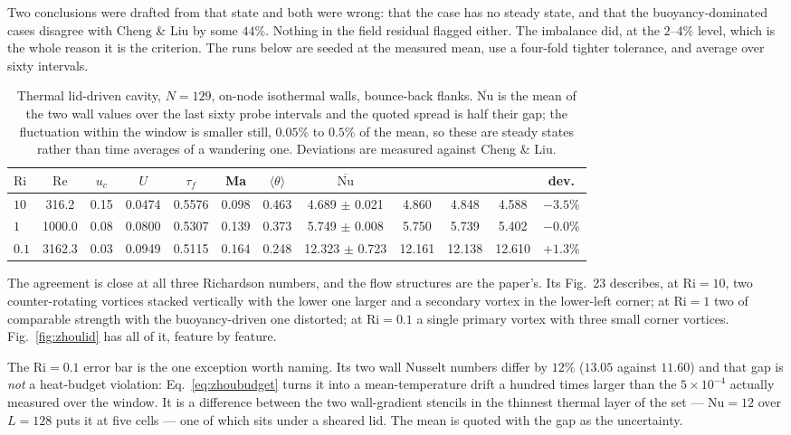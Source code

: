 \documentclass[11pt,a4paper]{article}
\begin{document}
Two conclusions were drafted from that state and both were wrong: that the case
has no steady state, and that the buoyancy-dominated cases disagree with
Cheng \& Liu by some $44\%$. Nothing in the field residual flagged either. The
imbalance did, at the $2$--$4\%$ level, which is the whole reason it is the
criterion. The runs below are seeded at the measured mean, use a four-fold
tighter tolerance, and average over sixty intervals.

\begin{table}[h]
\centering\small
\begin{tabular}{lccccccccccc}
\toprule
$\mathrm{Ri}$ & $\mathrm{Re}$ & $u_c$ & $U$ & $\tau_f$ & Ma &
$\langle\theta\rangle$ & $\overline{\mathrm{Nu}}$ &
\cite{chengliu2010} & \cite{bettaibi2014} & \cite{zhou2026} & dev. \\
\midrule
$10$ & 316.2 & 0.15 & 0.0474 & 0.5576 & 0.098 & 0.463 & 4.689 $\pm$ 0.021 & 4.860 & 4.848 & 4.588 & $-3.5\%$ \\
$1$ & 1000.0 & 0.08 & 0.0800 & 0.5307 & 0.139 & 0.373 & 5.749 $\pm$ 0.008 & 5.750 & 5.739 & 5.402 & $-0.0\%$ \\
$0.1$ & 3162.3 & 0.03 & 0.0949 & 0.5115 & 0.164 & 0.248 & 12.323 $\pm$ 0.723 & 12.161 & 12.138 & 12.610 & $+1.3\%$ \\
\bottomrule
\end{tabular}
\caption{Thermal lid-driven cavity, $N=129$, on-node isothermal walls,
bounce-back flanks. $\overline{\mathrm{Nu}}$ is the mean of the two wall values
over the last sixty probe intervals and the quoted spread is half their gap; the
fluctuation within the window is smaller still, $0.05\%$ to $0.5\%$ of the mean,
so these are steady states rather than time averages of a wandering one.
Deviations are measured against Cheng \& Liu.\label{tab:zhoulid}}
\end{table}

\noindent The agreement is close at all three Richardson numbers, and the flow
structures are the paper's. Its Fig.~23 describes, at $\mathrm{Ri}=10$, two
counter-rotating vortices stacked vertically with the lower one larger and a
secondary vortex in the lower-left corner; at $\mathrm{Ri}=1$ two of comparable
strength with the buoyancy-driven one distorted; at $\mathrm{Ri}=0.1$ a single
primary vortex with three small corner vortices. Fig.~\ref{fig:zhoulid} has all
of it, feature by feature.

The $\mathrm{Ri}=0.1$ error bar is the one exception worth naming. Its two wall
Nusselt numbers differ by $12\%$ ($13.05$ against $11.60$) and that gap is
\emph{not} a heat-budget violation: Eq.~\eqref{eq:zhoubudget} turns it into a
mean-temperature drift a hundred times larger than the $5\times10^{-4}$ actually
measured over the window. It is a difference between the two wall-gradient
stencils in the thinnest thermal layer of the set --- $\mathrm{Nu}=12$ over
$L=128$ puts it at five cells --- one of which sits under a sheared lid. The
mean is quoted with the gap as the uncertainty.
\end{document}
